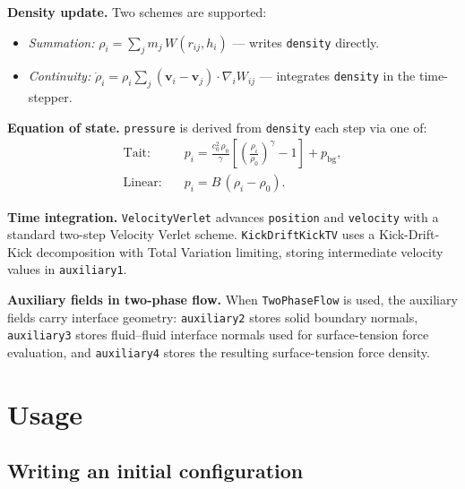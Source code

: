 \documentclass[10pt,a4paper]{article}
\begin{document}
\textbf{Density update.}  Two schemes are supported:
\begin{itemize}[itemsep=1pt]
  \item \emph{Summation:} $\rho_i = \sum_j m_j\,W(r_{ij}, h_i)$  --- writes
        \texttt{density} directly.
  \item \emph{Continuity:} $\dot\rho_i = \rho_i \sum_j
        (\mathbf{v}_i - \mathbf{v}_j)\cdot\nabla_i W_{ij}$ --- integrates
        \texttt{density} in the time-stepper.
\end{itemize}

\textbf{Equation of state.}  \texttt{pressure} is derived from \texttt{density}
each step via one of:
\begin{align*}
  \text{Tait:}\quad   & p_i = \frac{c_0^2\,\rho_0}{\gamma}
    \!\left[\!\left(\frac{\rho_i}{\rho_0}\right)^{\!\gamma} - 1\right] + p_\mathrm{bg},\\
  \text{Linear:}\quad & p_i = B\,(\rho_i - \rho_0).
\end{align*}

\textbf{Time integration.}
\texttt{VelocityVerlet} advances \texttt{position} and \texttt{velocity} with
a standard two-step Velocity Verlet scheme.  \texttt{KickDriftKickTV} uses a
Kick-Drift-Kick decomposition with Total Variation limiting, storing
intermediate velocity values in \texttt{auxiliary1}.

\textbf{Auxiliary fields in two-phase flow.}
When \texttt{TwoPhaseFlow} is used, the auxiliary fields carry interface
geometry: \texttt{auxiliary2} stores solid boundary normals, \texttt{auxiliary3}
stores fluid--fluid interface normals used for surface-tension force evaluation,
and \texttt{auxiliary4} stores the resulting surface-tension force density.

\section{Usage}

\subsection{Writing an initial configuration}
\end{document}
